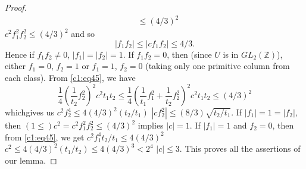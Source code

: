 \begin{proof}
\begin{align*}
&\leq (4/3)^{2} 
\end{align*}
\ie $c^{2}f^{2}_{1}f^{2}_{2}\leq (4/3)^{2}$ and so
$$
|f_{1}f_{2}|\leq |cf_{1}f_{2}|\leq 4/3.
$$
Hence if $f_{1}f_{2}\neq 0$, $|f_{1}|=|f_{2}|=1$. If $f_{1}f_{2}=0$,
then (since $U$ is in $GL_{2}(\mathbb{Z})$), either $f_{1}=0$,
$f_{2}=1$ or $f_{1}=1$, $f_{2}=0$ (taking only one primitive column
from each class). From \eqref{c1:eq45}, we have
$$
\frac{1}{4}\left(\frac{1}{t_{2}}f^{2}_{2}\right)^{2}c^{2}t_{1}t_{2}\leq
\frac{1}{4}\left(\frac{1}{t_{1}}f^{2}_{1}+\frac{1}{t_{2}}f^{2}_{2}\right)^{2}c^{2}t_{1}t_{2}\leq (4/3)^{2}
$$
which\pageoriginale gives us $c^{2}f^{4}_{2}\leq
4(4/3)^{2}(t_{2}/t_{1})$ \ie $|cf^{2}_{2}|\leq
(8/3)\sqrt{t_{2}/t_{1}}$. If $|f_{1}|=1=|f_{2}|$, then
$(1\leq)c^{2}=c^{2}f^{2}_{1}f^{2}_{2}\leq (4/3)^{2}$ implies
$|c|=1$. If $|f_{1}|=1$ and $f_{2}=0$, then from \eqref{c1:eq45}, we get
$c^{2}f^{4}_{1}t_{2}/t_{1}\leq 4(4/3)^{2}$ \ie $c^{2}\leq
4(4/3)^{2}(t_{1}/t_{2})\leq 4(4/3)^{3}<2^{4}$ \ie $|c|\leq 3$. This
proves all the assertions of our lemma.
\end{proof}

